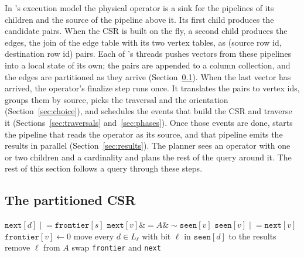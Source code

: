 In \duckdb's execution model the physical operator is a sink for the pipelines of its children and the source of
the pipeline above it. Its first child produces the candidate pairs. When the CSR is built on the fly, a second
child produces the edges, the join of the edge table with its two vertex tables, as (source row id, destination row
id) pairs. Each of \duckdb's threads pushes vectors from these pipelines into a local state of its own; the pairs
are appended to a column collection, and the edges are partitioned as they arrive (Section~\ref{sec:csr}). When the
last vector has arrived, the operator's finalize step runs once. It translates the pairs to vertex ids, groups them by
source, picks the traversal and the orientation (Section~\ref{sec:choice}), and schedules the events that build the
CSR and traverse it (Sections~\ref{sec:traversals} and~\ref{sec:phases}). Once those events are done,
\duckdb starts the pipeline that reads the operator as its source, and that pipeline emits the results in parallel
(Section~\ref{sec:results}). The planner sees an operator with one or two children and a cardinality and plans the
rest of the query around it. The rest of this section follows a query through these steps.

\subsection{The partitioned CSR}
\label{sec:csr}

\begin{algorithm}[t]
\caption{}
\label{alg:msbfs-level}
\footnotesize
\begin{algorithmic}[1]
 
        \State $\texttt{next}[d] \mathrel{|}= \texttt{frontier}[s]$
      \EndFor
    \EndIf
  \EndFor
\EndFor
{} 
    \State $\texttt{next}[v] \mathrel{\&}= A \mathbin{\&} {\sim}\texttt{seen}[v]$
    \State $\texttt{seen}[v] \mathrel{|}= \texttt{next}[v]$
    \State $\texttt{frontier}[v] \gets 0$
  \EndFor
\EndFor
{} 
  \State move every $d \in L_\ell$ with bit $\ell$ in $\texttt{seen}[d]$ to the results
    \State remove $\ell$ from $A$
  \EndIf
\EndFor
\State swap \texttt{frontier} and \texttt{next}
\end{algorithmic}
\end{algorithm}

